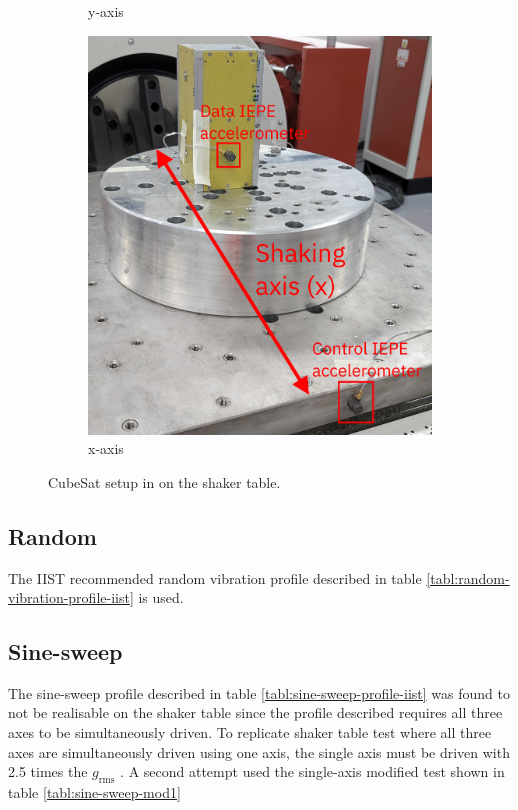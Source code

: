 \documentclass[]{report}
\begin{document}
\begin{figure}[H]
\begin{subfigure}{0.32\textwidth}
    \caption{y-axis}
  \end{subfigure}
  \begin{subfigure}{0.32\textwidth}
    \includegraphics[width=\linewidth]{images/x-axis-setup.jpg}
    \caption{x-axis}
  \end{subfigure}
  \caption{CubeSat setup in on the shaker table.}
  \label{fig:shaker-axis-setup}
\end{figure}

\subsection{Random}

The IIST recommended random vibration profile described in table \ref{tabl:random-vibration-profile-iist} is used.

\subsection{Sine-sweep}

The sine-sweep profile described in table \ref{tabl:sine-sweep-profile-iist} was found to not be realisable on the shaker table since the profile described requires all three axes to be simultaneously driven. To replicate shaker table test where all three axes are simultaneously driven using one axis, the single axis must be driven with 2.5 times the $g_\text{rms}$ \cite{nath2022study}. A second attempt used the single-axis modified test shown in table \ref{tabl:sine-sweep-mod1}
\end{document}
